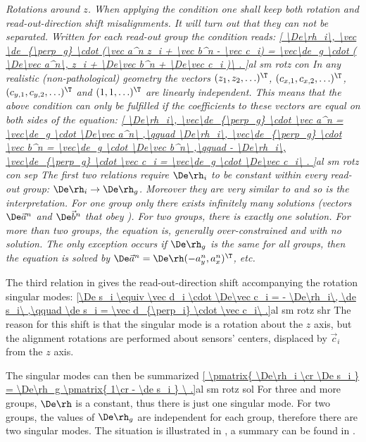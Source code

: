 \em{Rotations around $z$}. When applying the condition  one shall keep both rotation and read-out-direction shift misalignments. It will turn out that they can not be separated. Written for each read-out group the condition reads:
\eqref{
	\De\rh_i\, \vec \de_{\perp_g} \cdot (\vec a^n z_i + \vec b^n - \vec c_i) =
	\vec\de_g \cdot (
		\De\vec a^n\, z_i +
		\De\vec b^n +
		\De\vec c_i
	)\ .
}{al sm rotz con}
In any realistic (non-pathological) geometry the vectors $(z_1, z_2, \ldots)^\T$, $(c_{x,1}, c_{x,2}, \ldots)^\T$, $(c_{y,1}, c_{y,2},\ldots)^\T$ and $(1, 1, \ldots)^\T$ are linearly independent. This means that the above condition can only be fulfilled if the coefficients to these vectors are equal on both sides of the equation:
\eqref{
	\De\rh_i\, \vec\de_{\perp_g} \cdot \vec a^n = \vec\de_g \cdot \De\vec a^n\ ,\qquad
	\De\rh_i\, \vec\de_{\perp_g} \cdot \vec b^n = \vec\de_g \cdot \De\vec b^n\ ,\qquad
	- \De\rh_i\, \vec\de_{\perp_g} \cdot \vec c_i = \vec\de_g \cdot \De\vec c_i\ .
}{al sm rotz con sep}
The first two relations require $\De\rh_i$ to be constant within every read-out group: $\De\rh_i \rightarrow \De\rh_g$. Moreover they are very similar to  and so is the interpretation. For one group only there exists infinitely many solutions (vectors $\De\vec a^n$ and $\De\vec b^n$ that obey ). For two groups, there is exactly one solution. For more than two groups, the equation is, generally over-constrained and with no solution. The only exception occurs if $\De\rh_g$ is the same for all groups, then the equation is solved by $\De\vec a^n = \De\rh (-a^n_y, a^n_x)^\T$, etc.

The third relation in  gives the read-out-direction shift accompanying the rotation singular modes:
\eqref{\De s_i \equiv \vec d_i \cdot \De\vec c_i = - \De\rh_i\, \de s_i\ ,\qquad \de s_i = \vec d_{\perp_i} \cdot \vec c_i\ .}{al sm rotz shr}
The reason for this shift is that the singular mode is a rotation about the $z$ axis, but the alignment rotations are performed about sensors' centers, displaced by $\vec c_i$ from the $z$ axis.

The singular modes can then be summarized
\eqref{
\pmatrix{
	\De\rh_i \cr
	\De s_i
	}
= \De\rh_g \pmatrix{
	1\cr
	- \de s_i
}
\ .}{al sm rotz sol}
For three and more groups, $\De\rh$ is a constant, thus there is just one singular mode. For two groups, the values of $\De\rh_g$ are independent for each group, therefore there are two singular modes. The situation is illustrated in , a summary can be found in .

